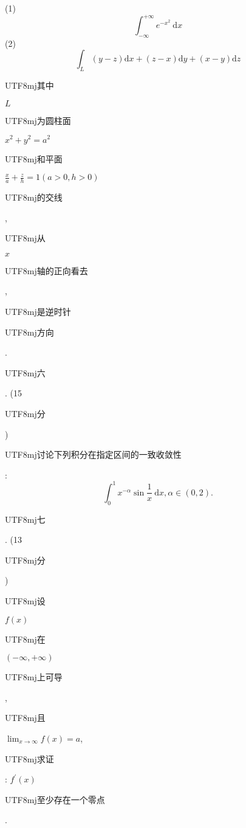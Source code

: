 \documentclass[10pt]{article}
\begin{document}
(1)
$$
\int_{-\infty}^{+\infty} e^{-x^{2}} \mathrm{~d} x
$$
(2)
$$
\int_{L}(y-z) \mathrm{d} x+(z-x) \mathrm{d} y+(x-y) \mathrm{d} z
$$
\begin{CJK}{UTF8}{mj}其中\end{CJK} $L$ \begin{CJK}{UTF8}{mj}为圆柱面\end{CJK} $x^{2}+y^{2}=a^{2}$ \begin{CJK}{UTF8}{mj}和平面\end{CJK} $\frac{x}{a}+\frac{z}{h}=1(a>0, h>0)$ \begin{CJK}{UTF8}{mj}的交线\end{CJK}, \begin{CJK}{UTF8}{mj}从\end{CJK} $x$ \begin{CJK}{UTF8}{mj}轴的正向看去\end{CJK}, \begin{CJK}{UTF8}{mj}是逆时针\end{CJK} \begin{CJK}{UTF8}{mj}方向\end{CJK}. \begin{CJK}{UTF8}{mj}六\end{CJK}. (15 \begin{CJK}{UTF8}{mj}分\end{CJK}) \begin{CJK}{UTF8}{mj}讨论下列积分在指定区间的一致收敛性\end{CJK}:
$$
\int_{0}^{1} x^{-\alpha} \sin \frac{1}{x} \mathrm{~d} x, \alpha \in(0,2) .
$$
\begin{CJK}{UTF8}{mj}七\end{CJK}. (13 \begin{CJK}{UTF8}{mj}分\end{CJK}) \begin{CJK}{UTF8}{mj}设\end{CJK} $f(x)$ \begin{CJK}{UTF8}{mj}在\end{CJK} $(-\infty,+\infty)$ \begin{CJK}{UTF8}{mj}上可导\end{CJK}, \begin{CJK}{UTF8}{mj}且\end{CJK} $\lim _{x \rightarrow \infty} f(x)=a$, \begin{CJK}{UTF8}{mj}求证\end{CJK}: $f^{\prime}(x)$ \begin{CJK}{UTF8}{mj}至少存在一个零点\end{CJK}.
\end{document}
